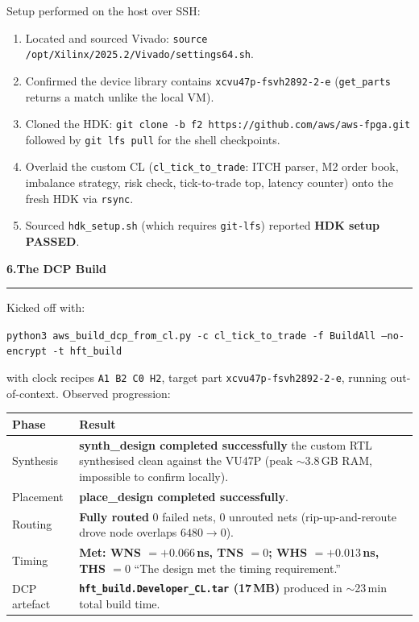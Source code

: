 \documentclass[10pt,a4paper]{article}
\newcommand{\sectionrule}{\par\nobreak\vspace{1pt}\textcolor{rulegray}{\rule{\linewidth}{0.8pt}}\par\vspace{1pt}}
\newcommand{\fpath}[1]{\texttt{\textcolor{hdrblue}{#1}}}
\newcommand{\cmd}[1]{\texttt{\textcolor{accentteal}{#1}}}
\newcommand{\sechead}[2]{{\large\bfseries\color{hdrblue} #1\quad #2}\sectionrule}
\begin{document}
Setup performed on the host over SSH:
\begin{enumerate}[leftmargin=2em,itemsep=1pt]
  \item Located and sourced Vivado: \cmd{source /opt/Xilinx/2025.2/Vivado/settings64.sh}.
  \item Confirmed the device library contains \fpath{xcvu47p-fsvh2892-2-e}
        (\cmd{get\_parts} returns a match \textendash{} unlike the local VM).
  \item Cloned the HDK: \cmd{git clone -b f2 https://github.com/aws/aws-fpga.git}
        followed by \cmd{git lfs pull} for the shell checkpoints.
  \item Overlaid the custom CL (\fpath{cl\_tick\_to\_trade}: ITCH parser, M2
        order book, imbalance strategy, risk check, tick-to-trade top, latency
        counter) onto the fresh HDK via \cmd{rsync}.
  \item Sourced \cmd{hdk\_setup.sh} (which requires \fpath{git-lfs}) \textendash{}
        reported \textbf{HDK setup PASSED}.
\end{enumerate}

\sechead{6.}{The DCP Build}

Kicked off with:
\begin{center}\small\fpath{python3 aws\_build\_dcp\_from\_cl.py -c cl\_tick\_to\_trade -f BuildAll --no-encrypt -t hft\_build}\end{center}

with clock recipes \fpath{A1\,B2\,C0\,H2}, target part
\fpath{xcvu47p-fsvh2892-2-e}, running out-of-context. Observed progression:

\begin{center}\small
\begin{tabularx}{\linewidth}{@{}lX@{}}
\toprule
\textbf{Phase} & \textbf{Result} \\
\midrule
Synthesis      & \textcolor{okgreen}{\textbf{synth\_design completed successfully}} \textendash{} the custom RTL synthesised clean against the VU47P (peak $\sim$3.8\,GB RAM, impossible to confirm locally). \\
Placement      & \textcolor{okgreen}{\textbf{place\_design completed successfully}}. \\
Routing        & \textcolor{okgreen}{\textbf{Fully routed}} \textendash{} 0 failed nets, 0 unrouted nets (rip-up-and-reroute drove node overlaps $6480 \to 0$). \\
Timing         & \textcolor{okgreen}{\textbf{Met: WNS $=+0.066$\,ns, TNS $=0$; WHS $=+0.013$\,ns, THS $=0$}} \textendash{} ``The design met the timing requirement.'' \\
DCP artefact   & \textcolor{okgreen}{\textbf{\fpath{hft\_build.Developer\_CL.tar} (17\,MB)}} produced in $\sim$23\,min total build time. \\
\bottomrule
\end{tabularx}
\end{center}
\end{document}
